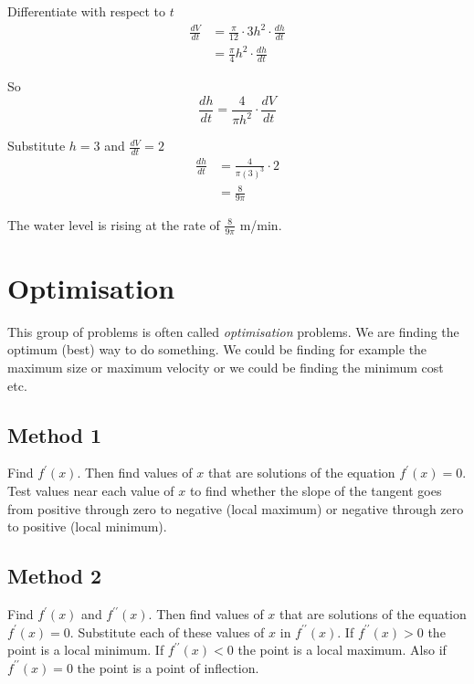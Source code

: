 Differentiate with respect to $t$
\begin{align*}\frac{d V}{d t} &  = \frac{\pi }{12} \cdot 3 h^{2} \cdot \frac{d h}{d t} \\
 &  = \frac{\pi }{4} h^{2} \cdot \frac{d h}{d t}\end{align*}

So
\begin{equation*}\frac{d h}{d t} =\frac{4}{\pi  h^{2}} \cdot \frac{d V}{d t}
\end{equation*}

Substitute $h =3$ and $\frac{d V}{d t} =2$
\begin{align*}\frac{d h}{d t} &  = \frac{4}{\pi  \left (3\right )^{3}} \cdot 2 \\
 &  = \frac{8}{9 \pi }\end{align*}

The water level is rising at the rate of $\frac{8}{9 \pi }$ $\mbox{m}$/$\mbox{min}$. 

\section{Optimisation}
This group of problems is often called \emph{optimisation} problems. We are finding
the optimum (best) way to do something. We could be finding for example the maximum size or maximum velocity
or we could be finding the minimum cost etc. 

\subsection*{Method 1}
Find $f^{ \prime } (x)$. Then find values of $x$ that are solutions of the equation $f^{ \prime } (x) =0$. Test values near each value of $x$ to find whether the slope of the tangent goes from positive through zero to negative (local maximum) or negative through zero
to positive (local minimum). 

\subsection*{Method 2}
Find $f^{ \prime } (x)$ and $f^{ \prime  \prime } (x)$. Then find values of $x$ that are solutions of the equation $f^{ \prime } (x) =0$. Substitute each of these values of $x$ in $f^{ \prime  \prime } (x)$. If $f^{ \prime  \prime } (x) >0$ the point is a local minimum. If $f^{ \prime  \prime } (x) <0$ the point is a local maximum. Also if $f^{ \prime  \prime } (x) =0$ the point is a point of inflection.\vspace{1cm} 

